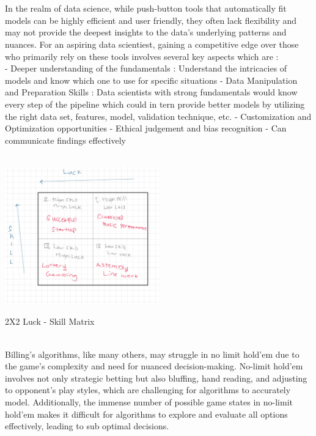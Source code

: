 \documentclass[12pt]{article}
\begin{document}
\begin{enumerate}
 \\ \\ 
In the realm of data science, while push-button tools that automatically fit models can be highly efficient and user friendly, they often lack flexibility and may not provide the deepest insights to the data's underlying patterns and nuances. For an aspiring data scientiest, gaining a competitive edge over those who primarily rely on these tools involves several key aspects which are :  \\ 
- Deeper understanding of the fundamentals :  Understand the intricacies of models and know which one to use for specific situations
- Data Manipulation and Preparation Skills : Data scientists with strong fundamentals would know every step of the pipeline which could in tern provide better models by utilizing the right data set, features, model, validation technique, etc. 
- Customization and Optimization opportunities
- Ethical judgement and bias recognition
- Can communicate findings effectively 

 \\ 


  \includegraphics[width=0.5\textwidth]{2x2.png}
  \caption{2X2 Luck - Skill Matrix}
  \label{fig:example}



 \\ 
Billing's algorithms, like many others, may struggle  in no limit hold'em due to the game's complexity and need for nuanced decision-making. No-limit hold'em involves not only strategic betting but also bluffing, hand reading, and adjusting to opponent's play styles, which are challenging for algorithms to accurately model. Additionally, the immense number of possible game states in no-limit hold'em makes it difficult for algorithms to explore and evaluate all options effectively, leading to sub optimal decisions.


\end{enumerate}
\end{document}
